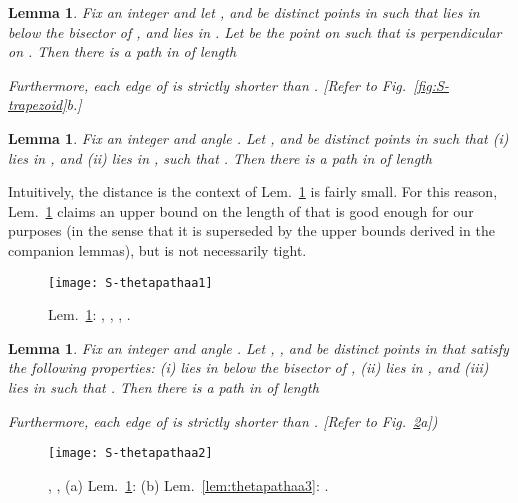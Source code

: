 \documentclass[11pt]{article}
\newtheorem{lemma}[theorem]{Lemma}
\begin{document}
\begin{lemma}
Fix an integer  and let ,  and  be distinct points in  such that  lies in  below the bisector of ,
and  lies in . Let  be the point on  such that  is perpendicular on . Then there is a path  in  of length

Furthermore, each edge of  is strictly shorter than . \emph{[Refer to Fig.~\ref{fig:S-trapezoid}b.]}
\label{lem:thetapathbb}
\end{lemma}

\begin{lemma}
Fix an integer  and angle . Let ,  and  be distinct points in  such that (i)  lies in ,
and (ii)  lies in , such that . Then there is a path  in  of length

\label{lem:thetapathaa1}
\end{lemma}
\vspace{-1.5em}
Intuitively, the distance  is the context of Lem.~\ref{lem:thetapathaa1} is fairly small. For this reason,
Lem.~\ref{lem:thetapathaa1} claims an upper bound on the length of  that is good enough for our purposes (in the sense that it is superseded by the upper bounds derived in the companion lemmas), but is not necessarily tight.

\begin{figure}[htpb]
\centering
\texttt{[image: S-thetapathaa1]}
\caption{Lem.~\ref{lem:thetapathaa1}: , , , .}
\label{fig:thetapathaa1}
\end{figure}


\vspace{-1em}
\begin{lemma}
Fix an integer  and angle . Let , ,  and  be distinct points in  that satisfy the following properties: (i)  lies in  below the bisector of , (ii)  lies in , and (iii)  lies in  such that . Then there is a path  in  of length

\noindent
Furthermore, each edge of  is strictly shorter than .
\emph{[Refer to Fig.~\ref{fig:S-thetapathaa2}a])}
\label{lem:thetapathaa2}
\end{lemma}

\begin{figure}[htpb]
\centering
\texttt{[image: S-thetapathaa2]}
\caption{, ,  (a) Lem.~\ref{lem:thetapathaa2}:  (b) Lem.~\ref{lem:thetapathaa3}: .}
\label{fig:S-thetapathaa2}
\end{figure}
\end{document}
